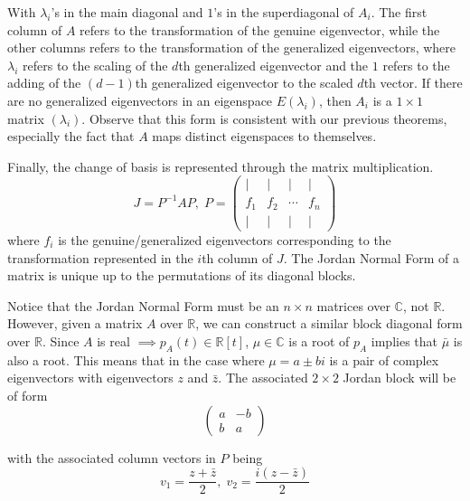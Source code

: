   With $\lambda_i$'s in the main diagonal and $1$'s in the superdiagonal of $A_i$. The first column of $A$ refers to the transformation of the genuine eigenvector, while the other columns refers to the transformation of the generalized eigenvectors, where $\lambda_i$ refers to the scaling of the $d$th generalized eigenvector and the $1$ refers to the adding of the $(d-1)$th generalized eigenvector to the scaled $d$th vector. If there are no generalized eigenvectors in an eigenspace $E(\lambda_i)$, then $A_i$ is a $1 \times 1$ matrix $( \lambda_i )$. Observe that this form is consistent with our previous theorems, especially the fact that $A$ maps distinct eigenspaces to themselves. 

  Finally, the change of basis is represented through the matrix multiplication. 
  \[J = P^{-1} A P, \; P = \begin{pmatrix}
  |&|&|&| \\ 
  f_1&f_2&\cdots&f_n \\
  |&|&|&|
  \end{pmatrix} \]
  where $f_i$ is the genuine/generalized eigenvectors corresponding to the transformation represented in the $i$th column of $J$. The Jordan Normal Form of a matrix is unique up to the permutations of its diagonal blocks. 

  Notice that the Jordan Normal Form must be an $n \times n$ matrices over $\mathbb{C}$, not $\mathbb{R}$. However, given a matrix $A$ over $\mathbb{R}$, we can construct a similar block diagonal form over $\mathbb{R}$. Since $A$ is real $\implies p_A (t) \in \mathbb{R}[t]$, $\mu \in \mathbb{C}$ is a root of $p_A$ implies that $\bar{\mu}$ is also a root. This means that in the case where $\mu = a \pm b i$ is a pair of complex eigenvectors with eigenvectors $z$ and $\bar{z}$. The associated $2 \times 2$ Jordan block will be of form
  \[\begin{pmatrix}
  a&-b\\ b&a
  \end{pmatrix}\]

  with the associated column vectors in $P$ being
  \[v_1 = \frac{z + \bar{z}}{2}, \; v_2 = \frac{i (z - \bar{z})}{2}\]

